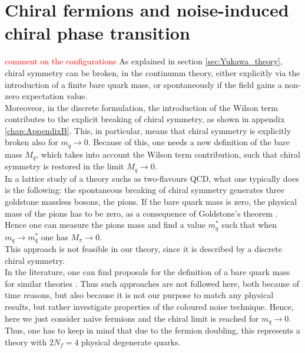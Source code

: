 \newpage


\section{Chiral fermions and noise-induced chiral phase transition}
\label{sec:chiral_PT}
\textcolor{red}{comment on the configurations}
As explained in section \ref{sec:Yukawa_theory}, chiral symmetry can be broken, in the continumm theory, either explicitly via the introduction of a finite bare quark mass, or spontaneously if the field gains a non-zero expectation value.\\
Moreoveor, in the discrete formulation, the introduction of the Wilson term contributes to the explicit breaking of chiral symmetry, as shown in appendix \ref{chap:AppendixB}. This, in particular, means that chiral symmetry is explicitly broken also for $m_q \to 0$. Because of this, one needs a new definition of the bare mass $M_q$, which takes into account the Wilson term contribution, such that chiral symmetry is restored in the limit $M_q \to 0$. \\
In a lattice study of a theory suchs as  two-flavours QCD, what one typically does \cite{rothe_LGT,gattringer_LQCD} is the following: the spontaneous breaking of chiral symmetry generates three goldstone massless bosons, the pions. If the bare quark mass is zero, the physical mass of the pions has to be zero, as a consequence of Goldstone's theorem \cite{goldstone}. Hence one can measure the pions mass and find a value $m_q^*$ such that when $m_q \to m_q^*$ one has $M_\pi \to 0$. \\
This approach is not feasible in our theory, since it is described by a discrete chiral symmetry. \\
In the literature, one can find proposals for the definition of a bare quark mass for similar theories \cite{Iwasaki:1994gq,MAIANI1986265}. Thus such approaches are not followed here, both because of time reasons, but also because it is not our purpose to match any physical results, but rather investigate properties of the coloured noise technique. Hence, here we just consider na\"ive fermions and the chiral limit is reached for $m_q \to 0$. Thus, one has to keep in mind that due to the fermion doubling, this represents a theory with $2N_f = 4$ physical degenerate quarks. \\~\\
